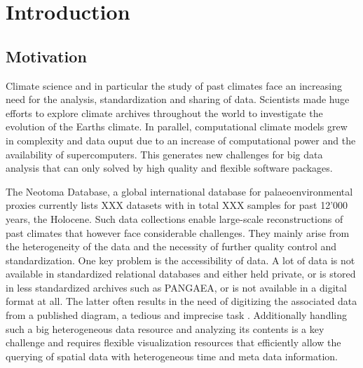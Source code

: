 
\chapter{Introduction} 

\label{chp:intro}

\begin{refsection}


\section{Motivation} \label{sec:motivation}

Climate science and in particular the study of past climates face an increasing need for the analysis, standardization and sharing of data. Scientists made huge efforts to explore climate archives throughout the world to investigate the evolution of the Earths climate\addref. In parallel, computational climate models grew in complexity and data ouput due to an increase of computational power and the availability of supercomputers\addref. This generates new challenges for big data analysis that can only solved by high quality and flexible software packages.

The Neotoma Database, a global international database for palaeoenvironmental proxies \citep{WilliamsGrimmBloisEtAl2018} currently lists XXX datasets with in total XXX samples for past 12'000 years, the Holocene. Such data collections enable large-scale reconstructions of past climates that however face considerable challenges. They mainly arise from the heterogeneity of the data and the necessity of further quality control and standardization. One key problem is the accessibility of data. A lot of data is not available in standardized relational databases and either held private, or is stored in less standardized archives such as PANGAEA, or is not available in a digital format at all. The latter often results in the need of digitizing the associated data from a published diagram, a tedious and imprecise task \citep{SommerRechChevalierEtAl2019}. Additionally handling such a big heterogeneous data resource and analyzing its contents is a key challenge and requires flexible visualization resources that efficiently allow the querying of spatial data with heterogeneous time and meta data information.


\end{refsection}
